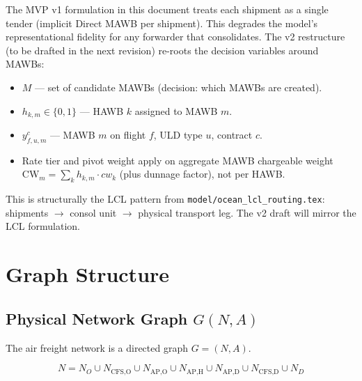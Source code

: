 \documentclass[11pt,a4paper]{article}
\theoremstyle{definition}
\begin{document}
The MVP v1 formulation in this document treats each shipment as a single tender
(implicit Direct MAWB per shipment). This degrades the model's representational
fidelity for any forwarder that consolidates. The v2 restructure (to be drafted in
the next revision) re-roots the decision variables around MAWBs:
\begin{itemize}[noitemsep]
  \item \(M\) — set of candidate MAWBs (decision: which MAWBs are created).
  \item \(h_{k,m} \in \{0,1\}\) — HAWB \(k\) assigned to MAWB \(m\).
  \item \(y_{f,u,m}^c\) — MAWB \(m\) on flight \(f\), ULD type \(u\), contract \(c\).
  \item Rate tier and pivot weight apply on aggregate MAWB chargeable weight
        \(\text{CW}_m = \sum_{k} h_{k,m} \cdot cw_k\) (plus dunnage factor), not per HAWB.
\end{itemize}
This is structurally the LCL pattern from \texttt{model/ocean\_lcl\_routing.tex}:
shipments \(\to\) consol unit \(\to\) physical transport leg. The v2 draft will
mirror the LCL formulation.

\section{Graph Structure}

\subsection{Physical Network Graph \texorpdfstring{$G(N, A)$}{G(N,A)}}

The air freight network is a directed graph $G = (N, A)$.

\[
  N = N_O \cup N_{\text{CFS,O}} \cup N_{\text{AP,O}} \cup N_{\text{AP,H}} \cup N_{\text{AP,D}} \cup N_{\text{CFS,D}} \cup N_D
\]
\end{document}
